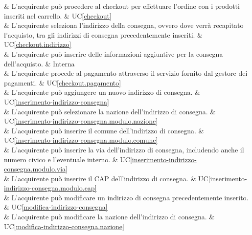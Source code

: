  & L'acquirente può procedere al checkout per effettuare l'ordine con i prodotti inseriti nel carrello. & UC\ref{checkout} \\

 & L'acquirente seleziona l'indirizzo della consegna, ovvero dove verrà recapitato l'acquisto, tra gli indirizzi di consegna precedentemente inseriti. & UC\ref{checkout.indirizzo} \\

 & L'acquirente può inserire delle informazioni aggiuntive per la consegna dell'acquisto. & Interna \\

 & L'acquirente procede al pagamento attraverso il servizio fornito dal gestore dei pagamenti. & UC\ref{checkout.pagamento} \\

 & L'acquirente può aggiungere un nuovo indirizzo di consegna. & UC\ref{inserimento-indirizzo-consegna} \\

 & L'acquirente può selezionare la nazione dell'indirizzo di consegna. & UC\ref{inserimento-indirizzo-consegna.modulo.nazione} \\

 & L'acquirente può inserire il comune dell'indirizzo di consegna. & UC\ref{inserimento-indirizzo-consegna.modulo.comune} \\

 & L'acquirente può inserire la via dell'indirizzo di consegna, includendo anche il numero civico e l'eventuale interno. & UC\ref{inserimento-indirizzo-consegna.modulo.via} \\

 & L'acquirente può inserire il CAP dell'indirizzo di consegna. & UC\ref{inserimento-indirizzo-consegna.modulo.cap} \\

 & L'acquirente può modificare un indirizzo di consegna precedentemente inserito. & UC\ref{modifica-indirizzo-consegna} \\

 & L'acquirente può modificare la nazione dell'indirizzo di consegna. & UC\ref{modifica-indirizzo-consegna.nazione} \\

